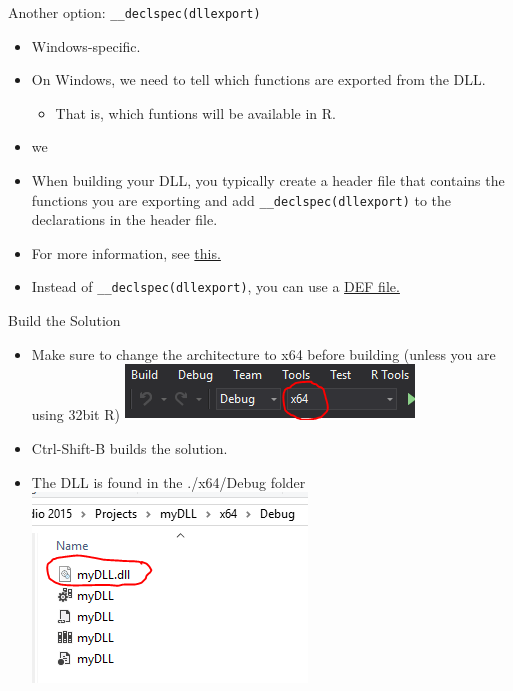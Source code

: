 \documentclass[ignorenonframetext,]{beamer}
\providecommand{\tightlist}{%
\setlength{\itemsep}{0pt}\setlength{\parskip}{0pt}}
\begin{document}
\begin{frame}[fragile]{Another option: \texttt{\_\_declspec(dllexport)}}

\begin{itemize}
\tightlist
\item
  Windows-specific.
\item
  On Windows, we need to tell which functions are exported from the DLL.

  \begin{itemize}
  \tightlist
  \item
    That is, which funtions will be available in R.
  \end{itemize}
\item
  we
\item
  When building your DLL, you typically create a header file that
  contains the functions you are exporting and add
  \texttt{\_\_declspec(dllexport)} to the declarations in the header
  file.
\item
  For more information, see
  \href{https://msdn.microsoft.com/en-us/library/a90k134d.aspx}{this.}
\item
  Instead of \texttt{\_\_declspec(dllexport)}, you can use a
  \href{https://msdn.microsoft.com/en-us/library/d91k01sh.aspx}{DEF
  file.}
\end{itemize}

\end{frame}

\begin{frame}{Build the Solution}

\begin{itemize}
\tightlist
\item
  Make sure to change the architecture to x64 before building (unless
  you are using 32bit R) \includegraphics{./x64.PNG}
\item
  Ctrl-Shift-B builds the solution.
\item
  The DLL is found in the ./x64/Debug folder \includegraphics{./DLL.PNG}
\end{itemize}

\end{frame}
\end{document}
